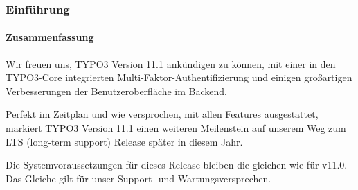 %

\begin{frame}[fragile]
	\frametitle{Einführung}
	\framesubtitle{Zusammenfassung}

	\small
		Wir freuen uns, TYPO3 Version 11.1 ankündigen zu können,
		mit einer in den TYPO3-Core integrierten Multi-Faktor-Authentifizierung
		und einigen großartigen Verbesserungen der Benutzeroberfläche im Backend.

		\vspace{0.2cm}

		Perfekt im Zeitplan und wie versprochen, mit allen Features ausgestattet, markiert
		TYPO3 Version 11.1 einen weiteren Meilenstein auf unserem Weg zum LTS
		(long-term support) Release später in diesem Jahr.

		\vspace{0.2cm}

		Die Systemvoraussetzungen für dieses Release bleiben die gleichen wie für v11.0.
		Das Gleiche gilt für unser Support- und Wartungsversprechen.

	\normalsize

\end{frame}

